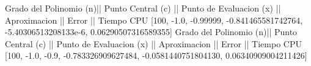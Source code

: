 Grado del Polinomio (n)|| Punto Central (c) || Punto de Evaluacion (x) || Aproximacion || Error || Tiempo CPU 
 [100, -1.0, -0.99999, -0.841465581742764, -5.40306513208133e-6, 0.06290507316589355]
Grado del Polinomio (n)|| Punto Central (c) || Punto de Evaluacion (x) || Aproximacion || Error || Tiempo CPU 
 [100, -1.0, -0.9, -0.783326909627484, -0.0581440751804130, 0.06340909004211426]
